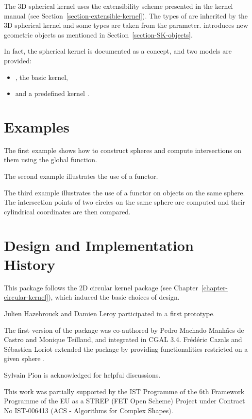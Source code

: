 The 3D spherical kernel uses the extensibility scheme presented in the
kernel manual (see Section~\ref{section-extensible-kernel}). The types
of  are inherited by the 3D spherical kernel and some
types are taken from the 
parameter.  introduces new geometric objects
as mentioned in Section~\ref{section-SK-objects}.

In fact, the spherical kernel is documented as a concept,
 and two models are provided: 
\begin{itemize}
\item {} , the basic kernel,
\item {} and a predefined kernel .
\end{itemize}

\section{Examples}

The first example shows how to construct spheres and compute
intersections on them using the global function.


The second example illustrates the use of a functor. 


  The third example illustrates the use of a functor on objects on the
  same sphere.  The intersection points of two circles on
  the same sphere are computed and their cylindrical coordinates are
  then compared.


\section{Design and Implementation History}

This package follows the 2D circular kernel package (see
Chapter~\ref{chapter-circular-kernel}), which induced the basic
choices of design.

Julien Hazebrouck and Damien Leroy participated in a first
prototype.

  The first version of the package was co-authored by Pedro Machado
  Manh\~{a}es de Castro and Monique Teillaud, and integrated in CGAL
  3.4.  Fr\'ed\'eric Cazals and S\'ebastien Loriot extended the
  package by providing functionalities restricted on a given sphere
  \cite{cclt-dc3sk-08}.  

Sylvain Pion is acknowledged for helpful discussions.

This work was partially supported by the IST Programme of the 6th
Framework Programme of the EU as a STREP (FET Open Scheme) Project
under Contract No IST-006413 (ACS -
Algorithms for Complex Shapes).
